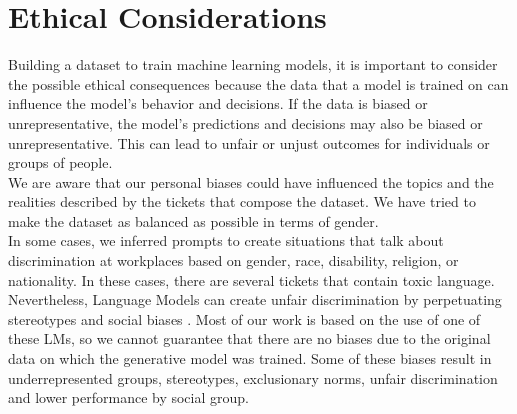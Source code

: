\chapter{Ethical Considerations}
Building a dataset to train machine learning models, it is important to consider the possible ethical consequences because the data that a model is trained on can influence the model's behavior and decisions. If the data is biased or unrepresentative, the model's predictions and decisions may also be biased or unrepresentative. This can lead to unfair or unjust outcomes for individuals or groups of people. \\
We are aware that our personal biases could have influenced the topics and the realities described by the tickets that compose the dataset. We have tried to make the dataset as balanced as possible in terms of gender. \\
In some cases, we inferred prompts to create situations that talk about discrimination at workplaces based on gender, race, disability, religion, or nationality. In these cases, there are several tickets that contain toxic language. \\
Nevertheless, Language Models can create unfair discrimination by perpetuating stereotypes and social biases \cite{abid2021persistent}\cite{lucy-bamman-2021-gender}. Most of our work is based on the use of one of these LMs, so we cannot guarantee that there are no biases due to the original data on which the generative model was trained. Some of these biases result in underrepresented groups, stereotypes, exclusionary norms, unfair discrimination and lower performance by social group\cite{weidinger2021ethical}. 

